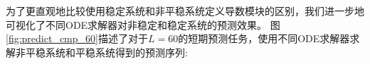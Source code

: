 为了更直观地比较使用稳定系统和非平稳系统定义导数模块的区别，我们进一步地可视化了不同ODE求解器对非稳定和稳定系统的预测效果。
图\ref{fig:predict_cmp_60}描述了对于$L=60$的短期预测任务，使用不同ODE求解器求解非平稳系统和平稳系统得到的预测序列:
\begin{figure}[h]
\centering
\end{figure}
